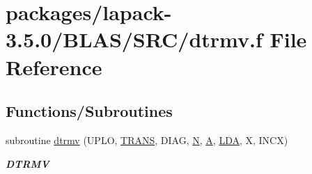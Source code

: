 \hypertarget{lapack-3_85_80_2BLAS_2SRC_2dtrmv_8f}{}\section{packages/lapack-\/3.5.0/\+B\+L\+A\+S/\+S\+R\+C/dtrmv.f File Reference}
\label{lapack-3_85_80_2BLAS_2SRC_2dtrmv_8f}
\subsection*{Functions/\+Subroutines}
\begin{DoxyCompactItemize}
\item 
subroutine \hyperlink{group__double__blas__level2_ga596c2acd9f81df6608bd5ed97e193897}{dtrmv} (U\+P\+L\+O, \hyperlink{superlu__enum__consts_8h_a0c4e17b2d5cea33f9991ccc6a6678d62a1f61e3015bfe0f0c2c3fda4c5a0cdf58}{T\+R\+A\+N\+S}, D\+I\+A\+G, \hyperlink{polmisc_8c_a0240ac851181b84ac374872dc5434ee4}{N}, \hyperlink{classA}{A}, \hyperlink{example__user_8c_ae946da542ce0db94dced19b2ecefd1aa}{L\+D\+A}, X, I\+N\+C\+X)
\begin{DoxyCompactList}\small\item\em {\bfseries D\+T\+R\+M\+V} \end{DoxyCompactList}\end{DoxyCompactItemize}
